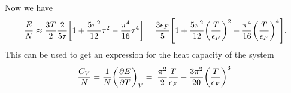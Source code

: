 \documentclass[11pt,letter, swedish, english
]{article}
\begin{document}
Now we have
\begin{equation}
\frac{E}{N}\approx\frac{3T}{2}\frac{2}{5\tau}
\qty[1+\frac{5\pi^2}{12}\tau^2-\frac{\pi^4}{16}\tau^4]
=\frac{3\epsilon_F}{5}\qty[1
+\frac{5\pi^2}{12}\qty(\frac{T}{\epsilon_F})^2
-\frac{\pi^4}{16}\qty(\frac{T}{\epsilon_F})^4].
\end{equation}
This can be used to get an expression for the heat capacity of the
system
\begin{equation}\label{eq:CV_Fermi}
\frac{C_V}{N}=\frac{1}{N}\qty(\pdv{E}{T})_V
=\;\frac{\pi^2}{2}\frac{T}{\epsilon_F}
 - \frac{3\pi^2}{20}\qty(\frac{T}{\epsilon_F})^3.
\end{equation}
\end{document}
